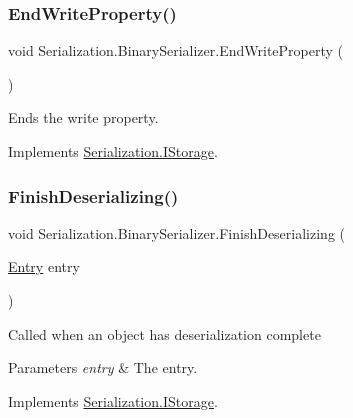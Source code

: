 \subsubsection{\texorpdfstring{End\+Write\+Property()}{EndWriteProperty()}}
{\footnotesize\ttfamily void Serialization.\+Binary\+Serializer.\+End\+Write\+Property (\begin{DoxyParamCaption}{ }\end{DoxyParamCaption})\hspace{0.3cm}{\ttfamily [inline]}}



Ends the write property. 



Implements \hyperlink{interface_serialization_1_1_i_storage_a978b5e23e42f8db83095b9dfd1102528}{Serialization.\+I\+Storage}.

\mbox{\label{class_serialization_1_1_binary_serializer_ad89d25a0b56c1b568f6696ab8d04d10b}} 
\subsubsection{\texorpdfstring{Finish\+Deserializing()}{FinishDeserializing()}}
{\footnotesize\ttfamily void Serialization.\+Binary\+Serializer.\+Finish\+Deserializing (\begin{DoxyParamCaption}\item[{\hyperlink{class_serialization_1_1_entry}{Entry}}]{entry }\end{DoxyParamCaption})\hspace{0.3cm}{\ttfamily [inline]}}



Called when an object has deserialization complete 


\begin{DoxyParams}{Parameters}
{\em entry} & The entry.\\
\hline
\end{DoxyParams}


Implements \hyperlink{interface_serialization_1_1_i_storage_a8377dea6764882fb9882d0bd92e03de6}{Serialization.\+I\+Storage}.

\mbox{\label{class_serialization_1_1_binary_serializer_af70f7fb26c0b41d0f1126634df2de03a}} 
